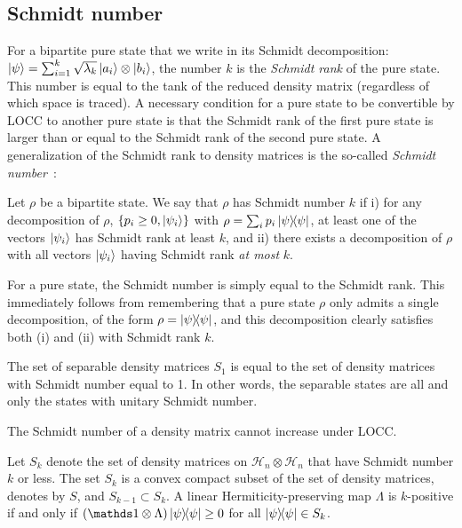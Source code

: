 \documentclass[a4paper]{report}
\newcommand{\calH}{{\mathcal{H}}}
\begin{document}
\subsection{Schmidt number}
For a bipartite pure state that we write in its Schmidt decomposition:
$\ket\psi = \sum_{i=1}^k \sqrt{\lambda_k} \ket{a_i} \otimes \ket{b_i}$,
the number $k$ is the \emph{Schmidt rank} of the pure state.
This number is equal to the tank of the reduced density matrix (regardless of which space is traced).
A necessary condition for a pure state to be convertible by \ac{LOCC} to another pure state is that the Schmidt rank of the first pure state is larger than or equal to the Schmidt rank of the second pure state.
A generalization of the Schmidt rank to density matrices is the so-called \emph{Schmidt number}~\parencite{terhal2000schmidt}:
\begin{defn}
	Let $\rho$ be a bipartite state.
	We say that $\rho$ has Schmidt number $k$ if
	i) for any decomposition of $\rho$, $\{p_i \ge 0, \ket{\psi_i}\}$ with $\rho = \sum_i p_i \ketbra{\psi}$, at least one of the vectors $\ket{\psi_i}$ has Schmidt rank at least $k$,
	and ii) there exists a decomposition of $\rho$ with all vectors $\ket{\psi_i}$ having Schmidt rank \emph{at most} $k$.
\end{defn}
For a pure state, the Schmidt number is simply equal to the Schmidt rank.
This immediately follows from remembering that a pure state $\rho$ only admits a single decomposition, of the form $\rho=\ketbra{\psi}$, and this decomposition clearly satisfies both (i) and (ii) with Schmidt rank $k$.
\begin{lemma}
	The set of separable density matrices $S_1$ is equal to the set of density matrices with Schmidt number equal to 1.
	In other words, the separable states are all and only the states with unitary Schmidt number.
\end{lemma}

\begin{thm}
	The Schmidt number of a density matrix cannot increase under \ac{LOCC}.
\end{thm}

\begin{defn}
	Let $S_k$ denote the set of density matrices on $\calH_n\otimes\calH_n$ that have Schmidt number $k$ or less.
	The set $S_k$ is a convex compact subset of the set of density matrices, denotes by $S$,
	and $S_{k-1} \subset S_k$.
	A linear Hermiticity-preserving map $\Lambda$ is $k$-positive if and only if
	$(\mathds1 \otimes \Lambda)\ketbra\psi \ge 0$ for all $\ketbra\psi \in S_k$.
\end{defn}
\end{document}
